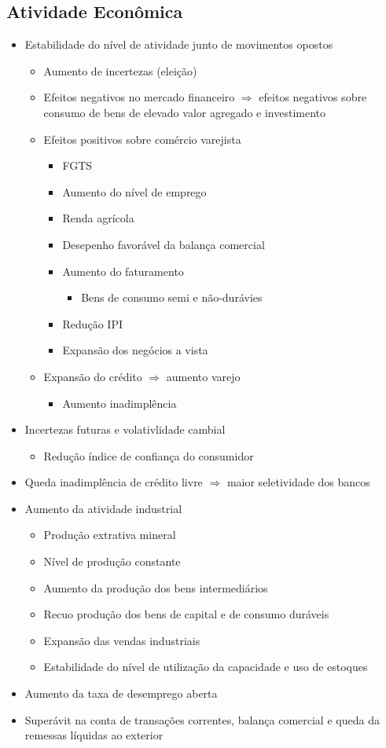 \documentclass[11pt]{article}
\begin{document}
\subsection*{Atividade Econômica}
\label{sec:orgc2dd9e7}
\begin{itemize}
\item Estabilidade do nível de atividade junto de movimentos opostos
\begin{itemize}
\item Aumento de incertezas (eleição)
\item Efeitos negativos no mercado financeiro \(\Rightarrow\) efeitos negativos sobre consumo de bens de elevado valor agregado e investimento
\item Efeitos positivos sobre comércio varejista
\begin{itemize}
\item FGTS
\item Aumento do nível de emprego
\item Renda agrícola
\item Desepenho favorável da balança comercial
\item Aumento do faturamento
\begin{itemize}
\item Bens de consumo semi e não-durávies
\end{itemize}
\item Redução IPI
\item Expansão dos negócios a vista
\end{itemize}
\item Expansão do crédito \(\Rightarrow\) aumento varejo
\begin{itemize}
\item Aumento inadimplência
\end{itemize}
\end{itemize}
\item Incertezas futuras e volativlidade cambial
\begin{itemize}
\item Redução índice de confiança do consumidor
\end{itemize}
\item Queda inadimplência de crédito livre \(\Rightarrow\) maior seletividade dos bancos
\item Aumento da atividade industrial
\begin{itemize}
\item Produção extrativa mineral
\item Nível de produção constante
\item Aumento da produção dos bens intermediários
\item Recuo produção dos bens de capital e de consumo duráveis
\item Expansão das vendas industriais
\item Estabilidade do nível de utilização da capacidade e uso de estoques
\end{itemize}
\item Aumento da taxa de desemprego aberta
\item Superávit na conta de transações correntes, balança comercial e queda da remessas líquidas ao exterior
\end{itemize}
\end{document}
